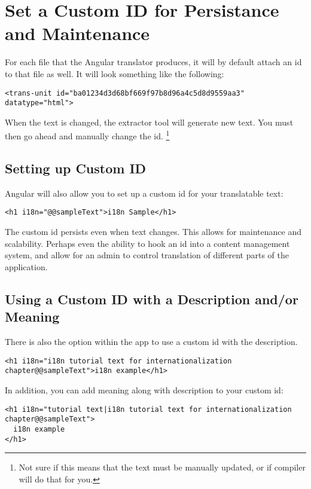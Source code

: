 \section{Set a Custom ID for Persistance and Maintenance}
For each file that the Angular translator produces, it will by default attach 
an id to that file as well. It will look something like the following: 
\begin{lstlisting}[caption=example.fr.xlf.html]
<trans-unit id="ba01234d3d68bf669f97b8d96a4c5d8d9559aa3" datatype="html">
\end{lstlisting}

When the text is changed, the extractor tool will generate new text. You 
must then go ahead and manually change the id. \footnote{Not sure if this 
means that the text must be manually updated, or if compiler will do that
for you.} 

\subsection{Setting up Custom ID}
Angular will also allow you to set up a custom id for your translatable text:
\begin{lstlisting}
<h1 i18n="@@sampleText">i18n Sample</h1>
\end{lstlisting}

The custom id persists even when text changes. This allows for maintenance 
and scalability. Perhaps even the ability to hook an id into a content 
management system, and allow for an admin to control translation of different
parts of the application. 

\subsection{Using a Custom ID with a Description and/or Meaning}
There is also the option within the app to use a custom id with the 
description. 
\begin{lstlisting}[caption=custom id with description]
<h1 i18n="i18n tutorial text for internationalization chapter@@sampleText">i18n example</h1>
\end{lstlisting}

In addition, you can add meaning along with description to your custom id:
\begin{lstlisting}[caption=custom id with meaning and description]
<h1 i18n="tutorial text|i18n tutorial text for internationalization chapter@@sampleText">
  i18n example
</h1>
\end{lstlisting}

